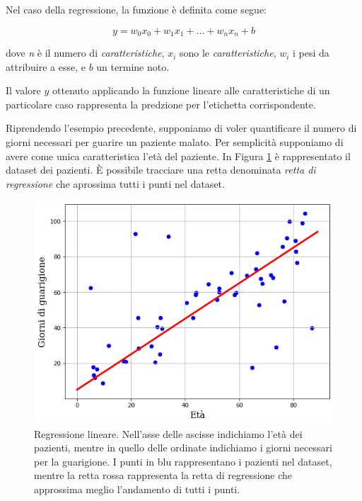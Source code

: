 \documentclass[a4paper,12pt]{report}
\begin{document}
Nel caso della regressione, la funzione è definita come segue: 

\begin{equation*}
    y  = w_0x_0 + w_1x_1 + \dots + w_nx_n + b
\end{equation*}

\noindent dove \textit{n} è il numero di \textit{caratteristiche}, $x_i$ sono le \textit{caratteristiche}, $w_i$ i pesi da attribuire a esse, e $b$ un termine noto.

Il valore $y$ ottenuto applicando la funzione lineare alle caratteristiche di un particolare caso rappresenta la predzione per l'etichetta corrispondente.

Riprendendo l'esempio precedente, supponiamo di voler quantificare il numero di giorni necessari per guarire un paziente malato. Per semplicità supponiamo di avere come unica caratteristica l'età del paziente. In Figura \ref{fig:linear_regression} è rappresentato il dataset dei pazienti. \`E possibile tracciare una retta denominata \textit{retta di regressione} che aprossima tutti i punti nel dataset.

\begin{figure}[ht]
    \centering
    \includegraphics[scale=0.7]{images/regressione_lineare.png}
    \caption{Regressione lineare. Nell'asse delle ascisse indichiamo l'età dei pazienti, mentre in quello delle ordinate indichiamo i giorni necessari per la guarigione. I punti in blu rappresentano i pazienti nel dataset, mentre la retta rossa rappresenta la retta di regressione che approssima meglio l'andamento di tutti i punti.}
    \label{fig:linear_regression}

\end{figure}
\end{document}
